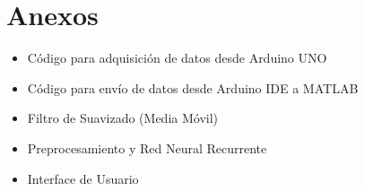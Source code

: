 \chapter{Anexos}
\label{chap:Anexos}

\begin{itemize}
    \item Código para adquisición de datos desde Arduino UNO
\end{itemize}



\begin{itemize}
    \item Código para envío de datos desde Arduino IDE a MATLAB
\end{itemize}



\begin{itemize}
    \item Filtro de Suavizado (Media Móvil)
\end{itemize}



\begin{itemize}
    \item Preprocesamiento y Red Neural Recurrente 
\end{itemize}



\begin{itemize}
    \item Interface de Usuario
\end{itemize}






